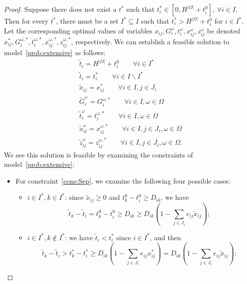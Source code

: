 \documentclass[11pt]{article}
\begin{document}
{\begin{proof}
		Suppose there does not exist a \(t^*\) such that \(t^*_i \in [0,H^{|\Omega|} + t_i^0],\ \forall i \in I\). Then for every \(t^*\), there must be a set \(I^* \subseteq I\) such that \(t_i^* > H^{|\Omega|} + t^0_i\) for $i \in I^*$. Let the corresponding optimal values of variables \(x_{ij}, G_i^\omega, t_i^\omega, x_{ij}^\omega, z_{ij}^\omega\) be denoted \(x_{ij}^*, G_i^{\omega,*}, t_i^{\omega,*}, x_{ij}^{\omega,*}, z_{ij}^{\omega,*}\), respectively. We can establish a feasible solution to model~\eqref{prob:extensive} as follows:
		\begin{subequations} \label{eqn:feasSol}
    		\begin{align}
    		    & \tilde{t}_i = H^{|\Omega|} + t^0_i \qquad \forall i \in I^* \label{eqn:tequal1} \\
    		    & \tilde{t}_i = t_i^* \qquad \forall i \in I \backslash I^* \label{eqn:tequal2}\\
    		    & \tilde{x}_{ij} = x_{ij}^* \qquad \forall i \in I, j \in J_i \\
    		    & \tilde{G}_i^\omega = G_i^{\omega,*} \qquad \forall i \in I, \omega \in \Omega \\
    		    & \tilde{t}_i^\omega = t^{\omega,*}_i \qquad \forall i \in I, \omega \in \Omega \\
    		    & \tilde{x}_{ij}^\omega = x_{ij}^{\omega,*} \qquad \forall i \in I, j \in J_i, \omega \in \Omega \\
    		    & \tilde{z}_{ij}^\omega = z_{ij}^{\omega,*} \qquad \forall i \in I, j \in J_i, \omega \in \Omega.
    		\end{align}
		\end{subequations}
		We see this solution is feasible by examining the constraints of model~\eqref{prob:extensive}:
		\begin{itemize}
		    \item For constraint~\eqref{cons:Sep}, we examine the following four possible cases:
		    \begin{itemize}
		        \item \(i \in I^*, k \in I^*\): since \(\tilde{x}_{ij} \geq 0\) and \(t_k^0 - t_i^0 \geq D_{ik}\), we have \[\tilde{t}_k - \tilde{t}_i  = t_k^0 - t_i^0 \geq D_{ik} \geq D_{ik} \left(1 - \sum_{j \in J_i} e_{ij} \tilde{x}_{ij} \right);\]
		        \item \(i \in I^*, k \notin I^*\): we have \(\tilde{t}_i < t_i^*\) since \(i \in I^*\), and then \[\tilde{t}_k - \tilde{t}_i > t_k^* - t_i^* \geq D_{ik} \left( 1 - \sum_{j \in J_i} e_{ij} x^*_{ij} \right) = D_{ik} \left(1 - \sum_{j \in J_i} e_{ij} \tilde{x}_{ij} \right);\]

\end{itemize}
\end{itemize}
\end{proof}}
\end{document}
